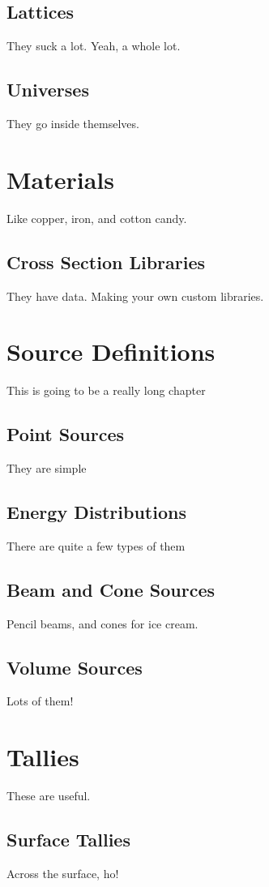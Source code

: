 \documentclass[10pt,a4paper]{book}
\begin{document}
\section{Lattices}
They suck a lot. Yeah, a whole lot.

\section{Universes}
They go inside themselves.

\chapter{Materials}
Like copper, iron, and cotton candy.

\section{Cross Section Libraries}
They have data. Making your own custom libraries.

\chapter{Source Definitions}
This is going to be a really long chapter

\section{Point Sources}
They are simple

\section{Energy Distributions}
There are quite a few types of them

\section{Beam and Cone Sources}
Pencil beams, and cones for ice cream.

\section{Volume Sources}
Lots of them!

\chapter{Tallies}
These are useful.

\section{Surface Tallies}
Across the surface, ho!
\end{document}
